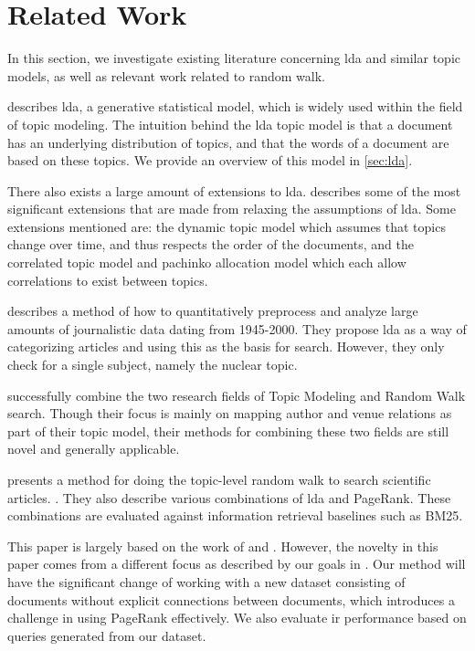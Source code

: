 \section{Related Work}\label{sec:related-works} 
In this section, we investigate existing literature concerning \gls{lda} and similar topic models, as well as relevant work related to random walk.

\citet{lda} describes \acrlong{lda}, a generative statistical model, which is widely used within the field of topic modeling. 
The intuition behind the \gls{lda} topic model is that a document has an underlying distribution of topics, and that the words of a document are based on these topics.
We provide an overview of this model in \autoref{sec:lda}.

There also exists a large amount of extensions to \gls{lda}.
\citet{blei2012topicmodels} describes some of the most significant extensions that are made from relaxing the assumptions of \gls{lda}.
Some extensions mentioned are: the dynamic topic model\cite{blei2006dynamic} which assumes that topics change over time, and thus respects the order of the documents, and the correlated topic model\cite{blei2007correlated} and pachinko allocation model\cite{li2006pachinko} which each allow correlations to exist between topics.


\citet{quanti} describes a method of how to quantitatively preprocess and analyze large amounts of journalistic data dating from 1945-2000. 
They propose \gls{lda} as a way of categorizing articles and using this as the basis for search.
However, they only check for a single subject, namely the nuclear topic.  


\citet{Tang2008} successfully combine the two research fields of Topic Modeling and Random Walk search. 
Though their focus is mainly on mapping author and venue relations as part of their topic model, their methods for combining these two fields are still novel and generally applicable.


\citet{yang2009topic} presents a method for doing the topic-level random walk to search scientific articles.
.
They also describe various combinations of \gls{lda} and PageRank.
These combinations are evaluated against information retrieval baselines such as BM25\cite{bm251996}.


This paper is largely based on the work of \citeauthor{yang2009topic}\cite{yang2009topic} and \citeauthor{Tang2008}\cite{Tang2008}.
However, the novelty in this paper comes from a different focus as described by our goals in .
Our method will have the significant change of working with a new dataset consisting of documents without explicit connections between documents, which introduces a challenge in using PageRank effectively.
We also evaluate \gls{ir} performance based on queries generated from our dataset.

